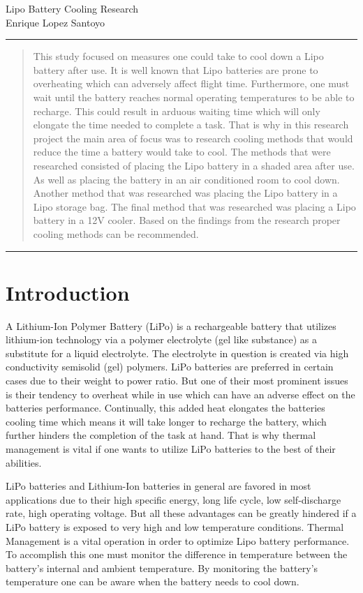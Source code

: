 \documentclass[12pt]{article}
\begin{document}
\begin{center}
	\huge{Lipo Battery Cooling Research} \\[10pt]
	\large{Enrique Lopez Santoyo}
\end{center}

\rule{\textwidth}{0.5pt}
\begin{abstract}
\noindent This study focused on measures one could take to cool down a Lipo battery after use. It is well known that Lipo batteries are prone to overheating which can adversely affect flight time. Furthermore, one must wait until the battery reaches normal operating temperatures to be able to recharge. This could result in arduous waiting time which will only elongate the time needed to complete a task. That is why in this research project the main area of focus was to research cooling methods that would reduce the time a battery would take to cool. The methods that were researched consisted of placing the Lipo battery in a shaded area after use. As well as placing the battery in an air conditioned room to cool down. Another method that was researched was placing the Lipo battery in a Lipo storage bag. The final method that was researched was placing a Lipo battery in a 12V cooler. Based on the findings from the research proper cooling methods can be recommended.
\end{abstract}
\rule{\textwidth}{0.5pt}

\section{Introduction}
A Lithium-Ion Polymer Battery (LiPo) is a rechargeable battery that utilizes lithium-ion technology via a polymer electrolyte (gel like substance) as a substitute for a liquid electrolyte. The electrolyte in question is created via high conductivity semisolid (gel) polymers. LiPo batteries are preferred in certain cases due to their weight to power ratio. But one of their most prominent issues is their tendency to overheat while in use which can have an adverse effect on the batteries performance. Continually, this added heat elongates the batteries cooling time which means it will take longer to recharge the battery, which further hinders the completion of the task at hand. That is why thermal management is vital if one wants to utilize LiPo batteries to the best of their abilities.

LiPo batteries and Lithium-Ion batteries in general are favored in most applications due to their high specific energy, long life cycle, low self-discharge rate, high operating voltage. But all these advantages can be greatly hindered if a LiPo battery is exposed to very high and low temperature conditions. Thermal Management is a vital operation in order to optimize Lipo battery performance. To accomplish this one must monitor the difference in temperature between the battery's internal and ambient temperature. By monitoring the battery's temperature one can be aware when the battery needs to cool down.
\end{document}
